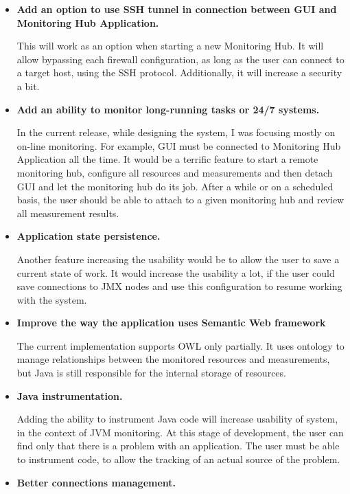 \begin{itemize}

\item {\bf Add an option to use SSH tunnel in connection between GUI and Monitoring Hub Application.}

This will work as an option when starting a new Monitoring Hub. It will allow bypassing each firewall configuration, as long as the user can connect to a target host, using the SSH protocol. Additionally, it will increase a security a bit.

\item {\bf Add an ability to monitor long-running tasks or 24/7 systems.}

In the current release, while designing the system, I was focusing mostly on on-line monitoring. For example, GUI must be connected to Monitoring Hub Application all the time. It would be a terrific feature to start a remote monitoring hub, configure all resources and measurements and then detach GUI and let the monitoring hub do its job. After a while or on a scheduled basis, the user should be able to attach to a given monitoring hub and review all measurement results.

\item {\bf Application state persistence.}

Another feature increasing the usability would be to allow the user to save a current state of work. It would increase the usability a lot, if the user could save connections to JMX nodes and use this configuration to resume working with the system.

\item {\bf Improve the way the application uses Semantic Web framework}

The current implementation supports OWL only partially. It uses ontology to manage relationships between the monitored resources and measurements, but Java is still responsible for the internal storage of resources.

\item {\bf Java instrumentation.}

Adding the ability to instrument Java code will increase usability of system, in the context of JVM monitoring. At this stage of development, the user can find only that there is a problem with an application. The user must be able to instrument code, to allow the tracking of an actual source of the problem.

\item {\bf Better connections management.}


\end{itemize}
